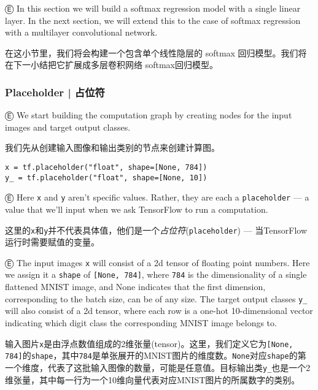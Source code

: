 Ⓔ \textcolor{etc}{In this section we will build a softmax regression model with a single linear layer. In the next section, we will extend this to the case of softmax regression with a multilayer convolutional network.}

在这小节里，我们将会构建一个包含单个线性隐层的 softmax 回归模型。我们将在下一小结把它扩展成多层卷积网络 softmax回归模型。

%
\subsubsection{Placeholder  |  占位符}

Ⓔ \textcolor{etc}{We start building the computation graph by creating nodes for the input images and target output classes.}

我们先从创建输入图像和输出类别的节点来创建计算图。

\begin{lstlisting}
x = tf.placeholder("float", shape=[None, 784])
y_ = tf.placeholder("float", shape=[None, 10])
\end{lstlisting}

Ⓔ \textcolor{etc}{Here \lstinline{x} and \lstinline{y} aren't specific values. Rather, they are each a \lstinline{placeholder} --- a value that we'll input when we ask TensorFlow to run a computation.}

这里的\lstinline{x}和\lstinline{y}并不代表具体值，他们是一个\emph{占位符}(\lstinline{placeholder}) --- 当TensorFlow运行时需要赋值的变量。

Ⓔ \textcolor{etc}{The input images \lstinline{x} will consist of a 2d tensor of floating point numbers. Here we assign it a \lstinline{shape} of \lstinline{[None, 784]}, where \lstinline{784} is the dimensionality of a single flattened MNIST image, and None indicates that the first dimension, corresponding to the batch size, can be of any size. The target output classes \lstinline{y_} will also consist of a 2d tensor, where each row is a one-hot 10-dimensional vector indicating which digit class the corresponding MNIST image belongs to.}

输入图片\lstinline{x}是由浮点数值组成的2维张量(tensor)。这里，我们定义它为\lstinline{[None, 784]}的\lstinline{shape}，其中\lstinline{784}是单张展开的MNIST图片的维度数。\lstinline{None}对应\lstinline{shape}的第一个维度，代表了这批输入图像的数量，可能是任意值。目标输出类\lstinline{y_}也是一个2维张量，其中每一行为一个10维向量代表对应MNIST图片的所属数字的类别。

